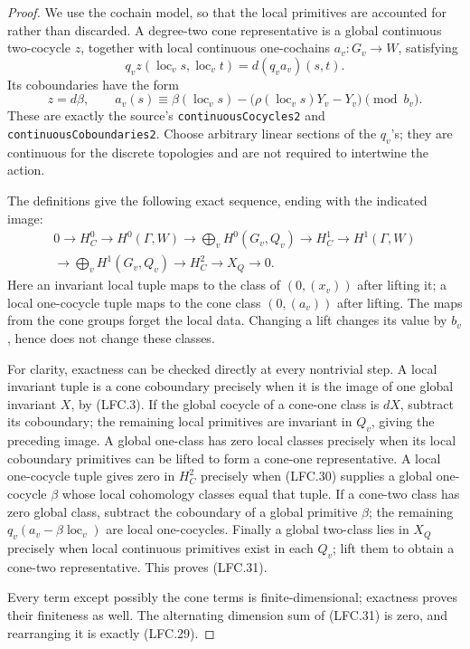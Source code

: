 \begin{proof}
We use the cochain model, so that the local primitives
are accounted for rather than discarded.
A degree-two cone representative is a global continuous
two-cocycle \(z\), together with local continuous
one-cochains \(a_v:G_v\to W\), satisfying
\[
 q_v z(\operatorname{loc}_v s,\operatorname{loc}_v t)
                         =d(q_v a_v)(s,t).
 \]
Its coboundaries have the form
\[
 z=d\beta,\qquad
 a_v(s)\equiv
   \beta(\operatorname{loc}_v s)
        -\bigl(\rho(\operatorname{loc}_v s)Y_v-Y_v\bigr)
                                    \pmod {b_v}.        \tag{LFC.30}
\]
These are exactly the source's
\texttt{continuousCocycles2} and
\texttt{continuousCoboundaries2}.
Choose arbitrary linear sections of the \(q_v\)'s;
they are continuous for the discrete topologies and
are not required to intertwine the action.

The definitions give the following exact sequence, ending
with the indicated image:
\[
 \begin{gathered}
 0\longrightarrow H^0_C\longrightarrow H^0(\Gamma,W)
 \longrightarrow \bigoplus_v H^0(G_v,Q_v)
 \longrightarrow H^1_C\longrightarrow H^1(\Gamma,W)\\
 \longrightarrow\bigoplus_v H^1(G_v,Q_v)
 \longrightarrow H^2_C\longrightarrow X_Q
 \longrightarrow0.                                    \tag{LFC.31}
 \end{gathered}
\]
Here an invariant local tuple maps to the class of
\((0,(x_v))\) after lifting it; a local one-cocycle
tuple maps to the cone class \((0,(a_v))\) after lifting.
The maps from the cone groups forget the local data.
Changing a lift changes its value by \(b_v\), hence
does not change these classes.

For clarity, exactness can be checked directly at every
nontrivial step.  A local invariant tuple is a cone
coboundary precisely when it is the image of one global
invariant \(X\), by (LFC.3).
If the global cocycle of a cone-one class is \(dX\),
subtract its coboundary; the remaining local primitives
are invariant in \(Q_v\), giving the preceding image.
A global one-class has zero local classes precisely
when its local coboundary primitives can be lifted to
form a cone-one representative.
A local one-cocycle tuple gives zero in \(H^2_C\)
precisely when (LFC.30) supplies a global one-cocycle
\(\beta\) whose local cohomology classes equal that tuple.
If a cone-two class has zero global class, subtract
the coboundary of a global primitive \(\beta\);
the remaining \(q_v(a_v-\beta\operatorname{loc}_v)\)
are local one-cocycles.
Finally a global two-class lies in \(X_Q\) precisely
when local continuous primitives exist in each \(Q_v\);
lift them to obtain a cone-two representative.
This proves (LFC.31).

Every term except possibly the cone terms is
finite-dimensional; exactness proves their finiteness
as well.  The alternating dimension sum of (LFC.31)
is zero, and rearranging it is exactly (LFC.29).
\end{proof}

